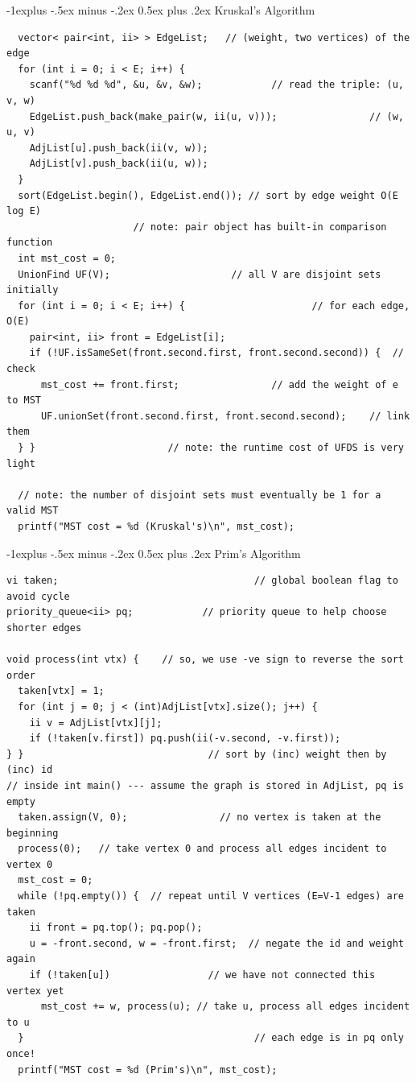 \documentclass[10pt,landscape]{article}
\makeatletter
\renewcommand{\subsection}{\@startsection{subsection}{2}{0mm}%
                                {-1explus -.5ex minus -.2ex}%
                                {0.5ex plus .2ex}%
                                {\normalfont\normalsize\bfseries}}
\makeatother
\begin{document}
\begin{multicols}{2}
\subsection{Kruskal's Algorithm}
\begin{lstlisting}
  vector< pair<int, ii> > EdgeList;   // (weight, two vertices) of the edge
  for (int i = 0; i < E; i++) {
    scanf("%d %d %d", &u, &v, &w);            // read the triple: (u, v, w)
    EdgeList.push_back(make_pair(w, ii(u, v)));                // (w, u, v)
    AdjList[u].push_back(ii(v, w));
    AdjList[v].push_back(ii(u, w));
  }
  sort(EdgeList.begin(), EdgeList.end()); // sort by edge weight O(E log E)
                      // note: pair object has built-in comparison function
  int mst_cost = 0;
  UnionFind UF(V);                     // all V are disjoint sets initially
  for (int i = 0; i < E; i++) {                      // for each edge, O(E)
    pair<int, ii> front = EdgeList[i];
    if (!UF.isSameSet(front.second.first, front.second.second)) {  // check
      mst_cost += front.first;                // add the weight of e to MST
      UF.unionSet(front.second.first, front.second.second);    // link them
  } }                       // note: the runtime cost of UFDS is very light

  // note: the number of disjoint sets must eventually be 1 for a valid MST
  printf("MST cost = %d (Kruskal's)\n", mst_cost);
\end{lstlisting}

\subsection{Prim's Algorithm}
\begin{lstlisting}
vi taken;                                  // global boolean flag to avoid cycle
priority_queue<ii> pq;            // priority queue to help choose shorter edges

void process(int vtx) {    // so, we use -ve sign to reverse the sort order
  taken[vtx] = 1;
  for (int j = 0; j < (int)AdjList[vtx].size(); j++) {
    ii v = AdjList[vtx][j];
    if (!taken[v.first]) pq.push(ii(-v.second, -v.first));
} }                                // sort by (inc) weight then by (inc) id
// inside int main() --- assume the graph is stored in AdjList, pq is empty
  taken.assign(V, 0);                // no vertex is taken at the beginning
  process(0);   // take vertex 0 and process all edges incident to vertex 0
  mst_cost = 0;
  while (!pq.empty()) {  // repeat until V vertices (E=V-1 edges) are taken
    ii front = pq.top(); pq.pop();
    u = -front.second, w = -front.first;  // negate the id and weight again
    if (!taken[u])                 // we have not connected this vertex yet
      mst_cost += w, process(u); // take u, process all edges incident to u
  }                                        // each edge is in pq only once!
  printf("MST cost = %d (Prim's)\n", mst_cost);
\end{lstlisting}


\end{multicols}
\end{document}
